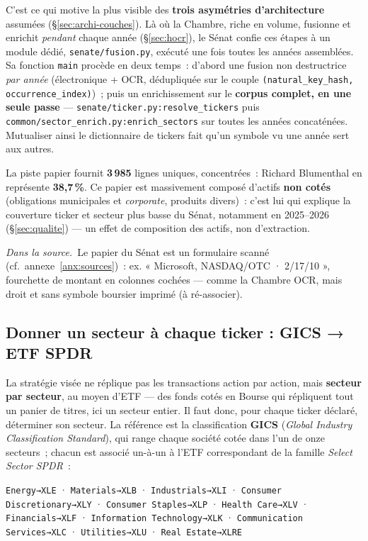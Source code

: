 \documentclass[11pt,a4paper]{article}
\newcommand{\co}[1]{\texttt{\small #1}}
\newcommand{\srcex}[1]{\par\smallskip\noindent{\color{black!55}\rule{2pt}{\baselineskip}}\hspace{6pt}\begin{minipage}{\dimexpr\linewidth-16pt}\small\textit{Dans la source.}\ #1\end{minipage}\par\smallskip}
\begin{document}
C'est ce qui motive la plus visible des \textbf{trois asymétries d'architecture} assumées
(\S{}\ref{sec:archi-couches}). Là où la Chambre, riche en volume, fusionne et enrichit \emph{pendant} chaque
année (\S{}\ref{sec:hocr}), le Sénat confie ces étapes à un module dédié, \co{senate/fusion.py}, exécuté une
fois toutes les années assemblées.
Sa fonction \co{main} procède en deux temps~: d'abord une fusion non destructrice \emph{par année}
(électronique + OCR, dédupliquée sur le couple \co{(natural_key_hash, occurrence_index)})~; puis un
enrichissement sur le \textbf{corpus complet, en une seule passe} — \co{senate/ticker.py:resolve_tickers}
puis \co{common/sector_enrich.py:enrich_sectors} sur toutes les années concaténées. Mutualiser ainsi le
dictionnaire de tickers fait qu'un symbole vu une année sert aux autres.

La piste papier fournit \textbf{3\,985} lignes uniques, concentrées~: Richard Blumenthal en représente
\textbf{38,7\,\%}. Ce papier est massivement composé d'actifs \textbf{non cotés} (obligations municipales
et \emph{corporate}, produits divers)~: c'est lui qui explique la couverture ticker et secteur plus basse du
Sénat, notamment en 2025--2026 (\S{}\ref{sec:qualite}) — un effet de composition des actifs, non d'extraction.

\srcex{Le papier du Sénat est un formulaire scanné (cf.~annexe~\ref{anx:sources})~: ex. « Microsoft,
NASDAQ/OTC · 2/17/10 », fourchette de montant en colonnes cochées — comme la Chambre OCR, mais droit et
sans symbole boursier imprimé (à ré-associer).}

\subsection{Donner un secteur à chaque ticker : GICS → ETF SPDR}
\label{sec:sector}
La stratégie visée ne réplique pas les transactions action par action, mais \textbf{secteur par secteur}, au
moyen d'ETF — des fonds cotés en Bourse qui répliquent tout un panier de titres, ici un secteur entier. Il
faut donc, pour chaque ticker déclaré, déterminer son secteur. La référence est la classification
\textbf{GICS} (\emph{Global Industry Classification Standard}), qui range chaque société cotée dans l'un de
onze secteurs~; chacun est associé un-à-un à l'ETF correspondant de la famille \emph{Select Sector SPDR}~:
\begin{center}\footnotesize
\co{Energy→XLE} · \co{Materials→XLB} · \co{Industrials→XLI} · \co{Consumer Discretionary→XLY} ·
\co{Consumer Staples→XLP} · \co{Health Care→XLV} · \co{Financials→XLF} · \co{Information Technology→XLK}
· \co{Communication Services→XLC} · \co{Utilities→XLU} · \co{Real Estate→XLRE}
\end{center}
\end{document}
